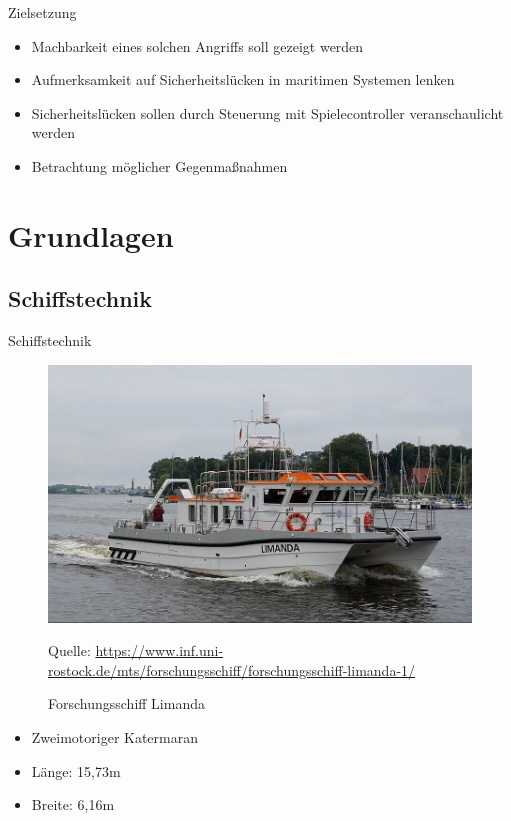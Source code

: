 \documentclass[usenames, dvipsnames, aspectratio=75]{beamer}
\begin{document}
    \begin{frame}{Zielsetzung}
        \begin{itemize}
            \item Machbarkeit eines solchen Angriffs soll gezeigt werden
            \item Aufmerksamkeit auf Sicherheitslücken in maritimen Systemen lenken
            \item Sicherheitslücken sollen durch Steuerung mit Spielecontroller veranschaulicht werden
            \item Betrachtung möglicher Gegenmaßnahmen
        \end{itemize}
    \end{frame}

\section{Grundlagen}

\subsection{Schiffstechnik}
\begin{frame}{Schiffstechnik}
    \begin{figure}
        \centering
        \includegraphics[width=0.6\linewidth]{assets/limanda.png}
        \captionsetup{skip=0pt}
        \caption*{\tiny{Quelle: \url{https://www.inf.uni-rostock.de/mts/forschungsschiff/forschungsschiff-limanda-1/}}}
        \caption{Forschungsschiff Limanda}
    \end{figure}
    \begin{itemize}
        \item Zweimotoriger Katermaran
        \item Länge: 15,73m 
        \item Breite: 6,16m
    \end{itemize}
\end{frame}
\end{document}
